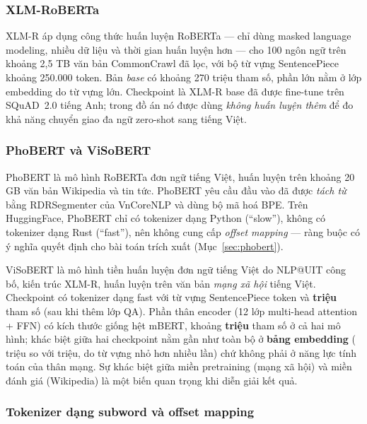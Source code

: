\subsubsection{XLM-RoBERTa}

XLM-R \cite{conneau2020xlmr} áp dụng công thức huấn luyện RoBERTa --- chỉ dùng masked
language modeling, nhiều dữ liệu và thời gian huấn luyện hơn --- cho 100 ngôn ngữ trên
khoảng 2,5 TB văn bản CommonCrawl đã lọc, với bộ từ vựng SentencePiece
\cite{kudo2018sentencepiece} khoảng 250.000 token. Bản \emph{base} có khoảng 270 triệu
tham số, phần lớn nằm ở lớp embedding do từ vựng lớn. Checkpoint
 \cite{deepset2020xlmr} là XLM-R base đã được
fine-tune trên SQuAD~2.0 tiếng Anh; trong đồ án nó được dùng \emph{không huấn luyện thêm}
để đo khả năng chuyển giao đa ngữ zero-shot sang tiếng Việt.

\subsubsection{PhoBERT và ViSoBERT}

PhoBERT \cite{nguyen2020phobert} là mô hình RoBERTa đơn ngữ tiếng Việt, huấn luyện trên
khoảng 20 GB văn bản Wikipedia và tin tức. PhoBERT yêu cầu đầu vào đã được \emph{tách từ}
bằng RDRSegmenter của VnCoreNLP và dùng bộ mã hoá BPE. Trên HuggingFace, PhoBERT chỉ có
tokenizer dạng Python (``slow''), không có tokenizer dạng Rust (``fast''), nên không cung
cấp \emph{offset mapping} --- ràng buộc có ý nghĩa quyết định cho bài toán trích xuất
(Mục~\ref{sec:phobert}).

ViSoBERT \cite{nguyen2023visobert} là mô hình tiền huấn luyện đơn ngữ tiếng Việt do
NLP@UIT công bố, kiến trúc XLM-R, huấn luyện trên văn bản \emph{mạng xã hội} tiếng Việt.
Checkpoint  có tokenizer dạng fast với từ vựng SentencePiece
\textbf{\tokVocabViso{}} token và \textbf{\tokParamsViso{} triệu} tham số (sau khi thêm lớp
QA). Phần thân encoder (12 lớp multi-head attention + FFN) có kích thước giống hệt mBERT,
khoảng \textbf{\tokBodyParamsViso{} triệu} tham số ở cả hai mô hình; khác biệt giữa hai
checkpoint nằm gần như toàn bộ ở \textbf{bảng embedding} (\tokEmbParamsMbert{} triệu so với
\tokEmbParamsViso{} triệu, do từ vựng nhỏ hơn nhiều lần) chứ không phải ở năng lực tính toán
của thân mạng. Sự khác biệt giữa miền pretraining (mạng xã hội) và miền đánh giá (Wikipedia)
là một biến quan trọng khi diễn giải kết quả.

\subsubsection{Tokenizer dạng subword và offset mapping}
\label{sec:offsets}

